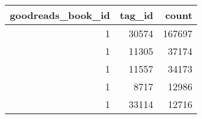 \begin{tabular}{rrr}
\toprule
 goodreads\_book\_id &  tag\_id &   count \\
\midrule
                 1 &   30574 &  167697 \\
                 1 &   11305 &   37174 \\
                 1 &   11557 &   34173 \\
                 1 &    8717 &   12986 \\
                 1 &   33114 &   12716 \\
\bottomrule
\end{tabular}
